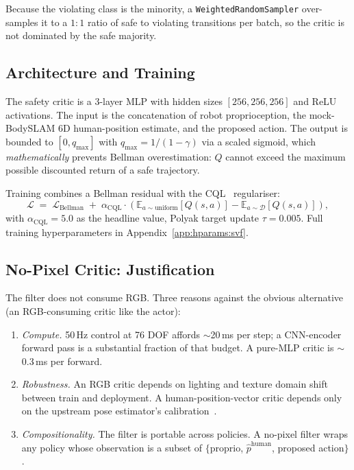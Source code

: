 \documentclass[11pt,a4paper]{report}
\newcommand{\bodyslampp}{BodySLAM\nolinebreak[4]\hspace{-.05em}\raisebox{.2ex}{\scriptsize ++}}
\begin{document}
Because the violating class is the minority, a
\texttt{WeightedRandomSampler} over-samples it to a $1{:}1$ ratio of
safe to violating transitions per batch, so the critic is not
dominated by the safe majority.

\subsection{Architecture and Training}
\label{sec:method:filter:arch}

The safety critic is a 3-layer MLP with hidden sizes
$[256, 256, 256]$ and ReLU activations. The input is the
concatenation of robot proprioception, the mock-\bodyslampp{} 6D
human-position estimate, and the proposed action. The output is
bounded to $[0, q_{\max}]$ with $q_{\max} = 1/(1-\gamma)$ via a
scaled sigmoid, which \emph{mathematically} prevents Bellman
overestimation: $Q$ cannot exceed the maximum possible discounted
return of a safe trajectory.

Training combines a Bellman residual with the
\textsc{CQL}~\cite{kumar2020cql} regulariser:
\begin{equation}
  \mathcal{L} \;=\; \mathcal{L}_{\mathrm{Bellman}}
  \;+\; \alpha_{\mathrm{CQL}} \cdot
  \left(\mathbb{E}_{a \sim \mathrm{uniform}}\!\left[Q(s,a)\right]
       - \mathbb{E}_{a \sim \mathcal{D}}\!\left[Q(s,a)\right]\right),
  \label{eq:cql-loss}
\end{equation}
with $\alpha_{\mathrm{CQL}} = 5.0$ as the headline value, Polyak
target update $\tau = 0.005$. Full training hyperparameters in
Appendix~\ref{app:hparams:svf}.

\subsection{No-Pixel Critic: Justification}
\label{sec:method:filter:nopixels}

The filter does not consume RGB. Three reasons against the obvious
alternative (an RGB-consuming critic like the actor):

\begin{enumerate}[topsep=2pt,itemsep=1pt]
\item \emph{Compute.} 50\,Hz control at 76 DOF affords $\sim$20\,ms
  per step; a CNN-encoder forward pass is a substantial fraction
  of that budget. A pure-MLP critic is $\sim$0.3\,ms per forward.
\item \emph{Robustness.} An RGB critic depends on lighting and
  texture domain shift between train and deployment. A
  human-position-vector critic depends only on the upstream pose
  estimator's calibration~\cite{henning2023bodyslampp}.
\item \emph{Compositionality.} The filter is portable across
  policies. A no-pixel filter wraps any policy whose observation
  is a subset of $\{$proprio, $\hat{p}^{\mathrm{human}}$, proposed
  action$\}$.
\end{enumerate}
\end{document}
